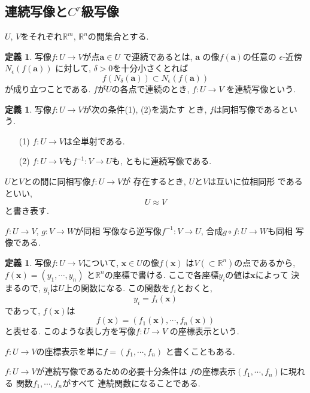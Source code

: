 \documentclass[a4j,12pt]{jarticle}
\theoremstyle{definition}
\newtheorem{definition}[theorem]{定義}
\begin{document}
\subsection{連続写像と$C^r$級写像}
$U$, $V$をそれぞれ$\mathbb{R}^m$, 
$\mathbb{R}^n$の開集合とする. 
\begin{definition}\label{def:continuous map}
    写像$f:U\to V$が点$\boldsymbol{a}\in U$
    で連続であるとは, $\boldsymbol{a}$
    の像$f(\boldsymbol{a})$の任意の
    $\epsilon$-近傍$N_\epsilon(f(\boldsymbol{a}))$
    に対して, $\delta>0$を十分小さくとれば
    $$f(N_\delta(\boldsymbol{a}))\subset
    N_\epsilon(f(\boldsymbol{a}))$$
    が成り立つことである. 
    $f$が$U$の各点で連続のとき, $f:U\to V$
    を連続写像という. 
\end{definition}
\begin{definition}\label{def:homeomorphism}
    写像$f:U\to V$が次の条件(1), (2)を満たす
    とき, $f$は同相写像であるという. 
    \begin{itemize}
        \item[(1)]
        $f:U\to V$は全単射である. 
        \item[(2)]
        $f:U\to V$も$f^{-1}:V\to U$も, 
        ともに連続写像である. 
    \end{itemize}

    $U$と$V$との間に同相写像$f:U\to V$が
    存在するとき, $U$と$V$は互いに位相同形
    であるといい, 
    $$U \approx V$$
    と書き表す. 
\end{definition}
$f:U\to V$, $g:V\to W$が同相
写像なら逆写像$f^{-1}:V\to U$, 
合成$g\circ f:U\to W$も同相
写像である. 
\begin{definition}\label{def:coordinate display}
    写像$f:U\to V$について, 
    $\boldsymbol{x}\in U$の像$f(\boldsymbol{x})$
    は$V(\subset \mathbb{R}^n)$の点であるから, 
    $f(\boldsymbol{x})=(y_1,\cdots ,y_n)$
    と$\mathbb{R}^n$の座標で書ける. 
    ここで各座標$y_i$の値は$\boldsymbol{x}$によって
    決まるので, $y_i$は$U$上の関数になる. 
    この関数を$f_i$とおくと, 
    $$y_i=f_i(\boldsymbol{x})$$
    であって, $f(\boldsymbol{x})$は
    $$f(\boldsymbol{x})=(f_1(\boldsymbol{x}),
    \cdots ,f_n(\boldsymbol{x}))$$
    と表せる. このような表し方を写像$f:U\to V$
    の座標表示という. 

    $f:U\to V$の座標表示を単に$f=(f_1,\cdots ,f_n)$
    と書くこともある. 
\end{definition}
$f:U\to V$が連続写像であるための必要十分条件は
$f$の座標表示$(f_1,\cdots ,f_n)$に現れる
関数$f_1,\cdots ,f_n$がすべて
連続関数になることである. 
\end{document}
